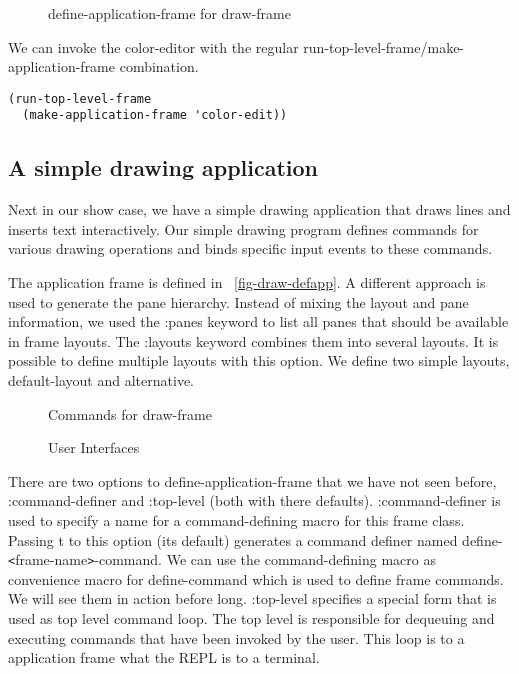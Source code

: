 \documentclass[twocolumn,a4paper]{article}
\newcommand {\code}[1]{{\sffamily #1}}
\let\class\code
\let\method\code
\let\constant\code
\let\macro\code
\let\keyword\code
\begin{document}
\begin{figure*}[t] \lstset{style=framestyle}

\caption{define-application-frame for
\class{draw-frame}}\label{fig-draw-defapp}\label{fig-draw-handlerepaint}
\end{figure*}

We can invoke the color-editor with the regular
\method{run-top-level-frame}/\method{make-application-frame}
combination.  
\lstset{style=inlinestyle}
\begin{lstlisting}
(run-top-level-frame 
  (make-application-frame 'color-edit))
\end{lstlisting}


\subsection{A simple drawing application}

Next in our show case, we have a simple drawing application that draws
lines and inserts text interactively. Our simple drawing program
defines commands for various drawing operations and binds specific
input events to these commands.

The application frame is defined in
\figurename~\ref{fig-draw-defapp}. A different approach is used to
generate the pane hierarchy. Instead of mixing the layout and pane
information, we used the \keyword{:panes} keyword to list all panes
that should be available in frame layouts. The \keyword{:layouts}
keyword combines them into several layouts. It is possible to define
multiple layouts with this option. We define two simple layouts,
\code{default-layout} and \code{alternative}.

\begin{figure*}[t]
\lstset{style=framestyle}

\caption{Commands for \class{draw-frame}}\label{fig-draw-commands}
\end{figure*}

\begin{figure*}
\lstset{style=framestyle}

\caption{User Interfaces}\label{fig-draw-interfacing}
\end{figure*}

There are two options to \macro{define-application-frame} that we have
not seen before, \keyword{:command-definer} and \keyword{:top-level}
(both with there defaults). \keyword{:command-definer} is used to
specify a name for a command-defining macro for this frame
class. Passing \constant{t} to this option (its default) generates a
command definer named
\macro{define-\texttt{<}frame-name\texttt{>}-command}. We can use the
command-defining macro as convenience macro for
\method{define-command} which is used to define frame commands. We
will see them in action before long. \keyword{:top-level} specifies a
special form that is used as top level command loop. The top level is
responsible for dequeuing and executing commands that have been
invoked by the user. This loop is to a application frame what the REPL
is to a terminal.
\end{document}
